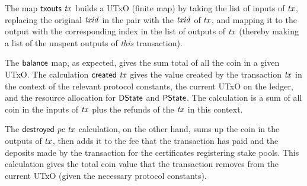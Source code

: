 \documentclass[11pt,a4paper]{article}
\newcommand{\DState}{\type{DState}}
\newcommand{\PState}{\type{PState}}
\theoremstyle{definition}
\theoremstyle{definition}
\begin{document}
The map $\mathsf{txouts}~ \mathit{tx}$ builds a UTxO (finite map) by taking the
list of inputs of $\mathit{tx}$, replacing the original $\mathit{txid}$ in the pair
with the $\mathit{txid}$ of $\mathit{tx}$, and mapping it to the output with the
corresponding index in the list of outputs of $\mathit{tx}$ (thereby making a list
of the unspent outputs of \textit{this} transaction).

The $\mathsf{balance}$ map, as expected, gives the sum total of all the coin in
a given UTxO. The calculation $\mathsf{created}~ \mathit{tx}$ gives the value created
by the transaction $\mathit{tx}$ in the context of the relevant protocol
constants, the current UTxO on the ledger, and the resource allocation for
$\DState$ and $\PState$. The calculation is a sum of all coin in the inputs of
$\mathit{tx}$ plus the refunds of the $\mathit{tx}$ in this context.

The $\mathsf{destroyed}~ \mathit{pc}~ \mathit{tx}$ calculation, on the other hand, sums up the
coin in the outputs of $\mathit{tx}$, then adds it to the fee that the transaction
has paid and the deposits made by the transaction for the certificates
registering stake pools. This calculation gives the total coin value that
the transaction removes from the current UTxO (given the necessary protocol
constants).
\end{document}
